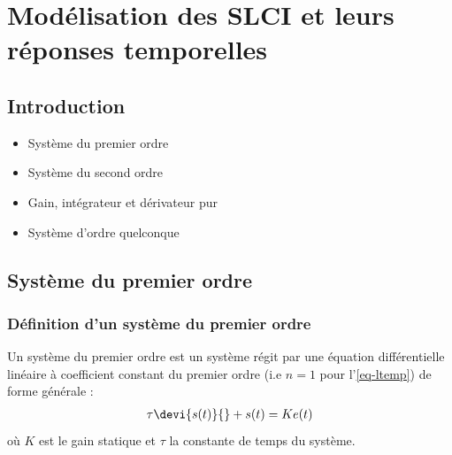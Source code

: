 \chapter[Modélisation des SLCI]{Modélisation des SLCI\label{chap-model} et leurs réponses temporelles}
\minitoc
\newpage
\section{Introduction}
\begin{itemize}
    \item Système du premier ordre
    \item Système du second ordre
    \item Gain, intégrateur et dérivateur pur
    \item Système d'ordre quelconque
\end{itemize}

\acpl

\newpage
\section{Système du premier ordre}

\subsection{Définition d'un système du premier ordre}
Un système du premier ordre est un système régit par une équation
différentielle linéaire à coefficient constant du premier ordre (i.e $n=1$ pour l'\cref{eq-ltemp}) de forme générale :
\begin{align}
    \tau\devi{s(t)}{}+s(t)=K e(t)\label{eq-1er}
\end{align}
où $K$ est le gain statique et $\tau$ la constante de temps du système.

